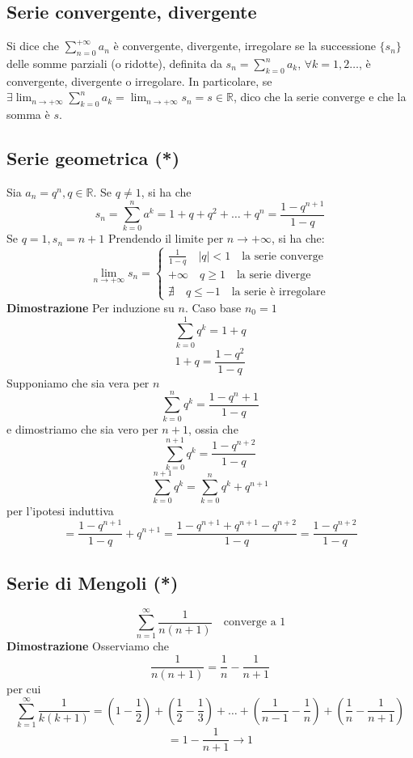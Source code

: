 \documentclass[12pt]{article}
\begin{document}
\subsection{Serie convergente, divergente}
Si dice che $\displaystyle \sum_{n=0}^{+\infty} a_n$ è convergente, divergente, irregolare se la successione $\{ s_n \}$ delle somme parziali (o ridotte), definita da $s_n = \sum_{k=0}^n a_k$, $\forall k = 1, 2 \dots$, è convergente, divergente o irregolare. In particolare, se $\displaystyle \exists \lim_{n \to +\infty} \sum_{k=0}^n a_k = \lim_{n \to +\infty} s_n = s \in \mathbb{R}$, dico che la serie converge e che la somma è $s$.

\subsection{Serie geometrica (*)}
Sia \(a_n = q^n, q \in \mathbb{R}\). Se \(q \neq 1\), si ha che
\[ s_n =  \sum_{k=0}^n a^k = 1 + q + q^2 + \dots + q^n = \frac{1-q^{n+1}}{1-q}\]
Se \(q=1, s_n = n+1\)
Prendendo il limite per \(n \to +\infty\), si ha che:
\[
\lim_{n \to +\infty} s_n = 
\begin{cases}
\frac{1}{1-q} \quad |q| < 1 \quad \text{la serie converge}\\
+\infty \quad q \geq 1 \quad \text{la serie diverge}\\
\nexists \quad q \leq -1 \quad \text{la serie è irregolare}
\end{cases}
\]
\textbf{Dimostrazione}\newline
Per induzione su \(n\). Caso base \(n_0 = 1\)
\[\sum_{k=0}^1 q^k = 1+q\]
\[1+q = \frac{1-q^2}{1-q}\]
Supponiamo che sia vera per $n$
\[ \sum_{k=0}^n q^k = \frac{1-q^n+1}{1-q}\]
e dimostriamo che sia vero per $n+1$, ossia che
\[ \sum_{k=0}^{n+1} q^k = \frac{1-q^{n+2}}{1-q} \]
\[  \sum_{k=0}^{n+1} q^k =  \sum_{k=0}^{n} q^k + q^{n+1}\]
per l'ipotesi induttiva
\[ = \frac{1-q^{n+1}}{1-q}+q^{n+1} = \frac{1-q^{n+1}+q^{n+1}-q^{n+2}}{1-q} = \frac{1-q^{n+2}}{1-q}\]

\subsection{Serie di Mengoli (*)}
\[ \sum_{n = 1}^{\infty} \frac{1}{n(n+1)} \quad \text{converge a 1}\]
\textbf{Dimostrazione}\newline
Osserviamo che
\[ \frac{1}{n(n+1)} = \frac{1}{n} - \frac{1}{n+1}\]
per cui
\[ \sum_{k = 1}^{\infty} \frac{1}{k(k+1)} = \left(1- \frac{1}{2} \right) + \left(\frac{1}{2} - \frac{1}{3} \right) + \dots + \left( \frac{1}{n-1} - \frac{1}{n} \right) + \left( \frac{1}{n} - \frac{1}{n+1} \right) \]
\[ = 1 - \frac{1}{n+1} \to 1\]
\end{document}
